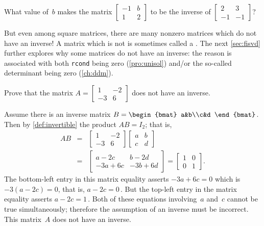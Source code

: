 \begin{activity}
What value of~\(b\) makes the matrix \(\begin{bmatrix} -1&b\\1&2 \end{bmatrix}\) to be the inverse of
\(\begin{bmatrix} 2&3\\-1&-1 \end{bmatrix}\)?
\end{activity}





But even among square matrices, there are many nonzero matrices which do not have an inverse!
A matrix which is not  is sometimes called a .
The next \cref{sec:fisvd} further explores why some matrices do not have an inverse: the reason is associated with both \verb|rcond| being zero (\cref{pro:unisol}) and/or the so-called determinant being zero (\cref{ch:ddm}).

\begin{example}[no inverse] \label{eg:no2x2inv}
Prove that the matrix
\(A=\begin{bmatrix} 1&-2\\-3&6 \end{bmatrix}\)
does not have an inverse.
\begin{solution} 
Assume there is an inverse matrix
\(B=\begin{bmat} a&b\\c&d \end{bmat}\).
Then by \cref{def:invertible} the product \(AB=I_2\); that is,
\begin{eqnarray*}
AB&=&\begin{bmatrix} 1&-2\\-3&6 \end{bmatrix}
\begin{bmatrix} a&b\\c&d \end{bmatrix}
\\&=&\begin{bmatrix} a-2c&b-2d\\-3a+6c&-3b+6d \end{bmatrix}
=\begin{bmatrix} 1&0\\0&1 \end{bmatrix}.
\end{eqnarray*}
The bottom-left entry in this matrix equality asserts \(-3a+6c=0\) which is \(-3(a-2c)=0\), that is, \(a-2c=0\)\,.
But the top-left entry in the matrix equality asserts \(a-2c=1\)\,.
Both of these equations involving~\(a\) and~\(c\) cannot be true simultaneously; therefore the assumption of an inverse must be incorrect.
This matrix~\(A\) does not have an inverse.
\end{solution}
\end{example}



